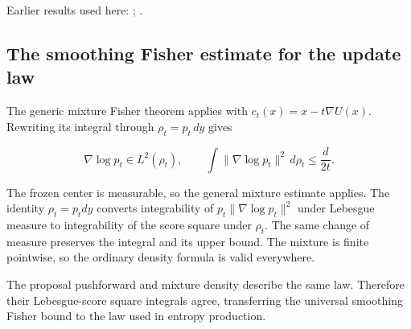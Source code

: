\documentclass[11pt,a4paper]{report}
\begin{document}
Earlier results used here: \cite[Section~3.34.1]{LangevinLean2026ULASC}; \cite[Section~3.36.5]{LangevinLean2026ULASC}.
\subsection{\texorpdfstring{The smoothing Fisher estimate for the update law}{The smoothing Fisher estimate for the update law}}
\label{report-step-UnadjustedLangevin-LSI-GaussianEntropy-lean-27}


The generic mixture Fisher theorem applies with \(c_t(x)=x-t\nabla U(x)\). Rewriting its integral through \(\rho_t=p_t\,dy\) gives

\[\nabla\log p_t\in L^2(\rho_t),\qquad\int\|\nabla\log p_t\|^2\,d\rho_t\le\frac d{2t}.\]

The frozen center is measurable, so the general mixture estimate applies. The identity \(\rho_t=p_tdy\) converts integrability of \(p_t\|\nabla\log p_t\|^2\) under Lebesgue measure to integrability of the score square under \(\rho_t\). The same change of measure preserves the integral and its upper bound. The mixture is finite pointwise, so the ordinary density formula is valid everywhere.



The proposal pushforward and mixture density describe the same law. Therefore their Lebesgue-score square integrals agree, transferring the universal smoothing Fisher bound to the law used in entropy production.
\end{document}
